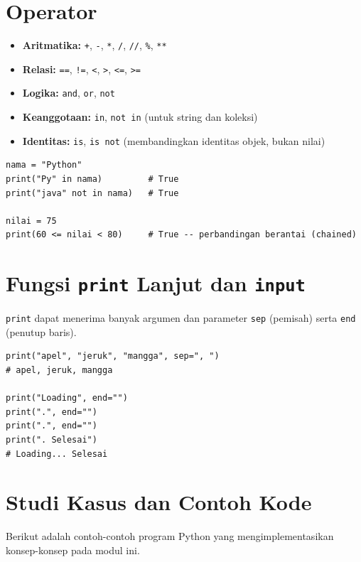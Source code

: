 \documentclass[../main.tex]{subfiles}
\begin{document}
\section{Operator}

\begin{itemize}[leftmargin=*]
  \item \textbf{Aritmatika:} \texttt{+}, \texttt{-}, \texttt{*}, \texttt{/}, \texttt{//}, \texttt{\%}, \texttt{**}
  \item \textbf{Relasi:} \texttt{==}, \texttt{!=}, \texttt{<}, \texttt{>}, \texttt{<=}, \texttt{>=}
  \item \textbf{Logika:} \texttt{and}, \texttt{or}, \texttt{not}
  \item \textbf{Keanggotaan:} \texttt{in}, \texttt{not in} (untuk string dan koleksi)
  \item \textbf{Identitas:} \texttt{is}, \texttt{is not} (membandingkan identitas objek, bukan nilai)
\end{itemize}

\begin{lstlisting}[caption=Operator in dan chained comparison]
nama = "Python"
print("Py" in nama)         # True
print("java" not in nama)   # True

nilai = 75
print(60 <= nilai < 80)     # True -- perbandingan berantai (chained)
\end{lstlisting}

\section{Fungsi \texttt{print} Lanjut dan \texttt{input}}

\texttt{print} dapat menerima banyak argumen dan parameter \texttt{sep} (pemisah) serta \texttt{end} (penutup baris).

\begin{lstlisting}[caption=Parameter print: sep dan end]
print("apel", "jeruk", "mangga", sep=", ")
# apel, jeruk, mangga

print("Loading", end="")
print(".", end="")
print(".", end="")
print(". Selesai")
# Loading... Selesai
\end{lstlisting}

\section{Studi Kasus dan Contoh Kode}

Berikut adalah contoh-contoh program Python yang mengimplementasikan konsep-konsep pada modul ini.
\end{document}

